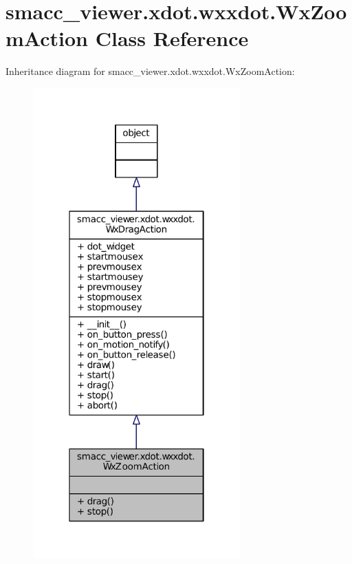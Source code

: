 \hypertarget{classsmacc__viewer_1_1xdot_1_1wxxdot_1_1WxZoomAction}{}\section{smacc\+\_\+viewer.\+xdot.\+wxxdot.\+Wx\+Zoom\+Action Class Reference}
\label{classsmacc__viewer_1_1xdot_1_1wxxdot_1_1WxZoomAction}


Inheritance diagram for smacc\+\_\+viewer.\+xdot.\+wxxdot.\+Wx\+Zoom\+Action\+:
\nopagebreak
\begin{figure}[H]
\begin{center}
\leavevmode
\includegraphics[width=226pt]{classsmacc__viewer_1_1xdot_1_1wxxdot_1_1WxZoomAction__inherit__graph}
\end{center}
\end{figure}


